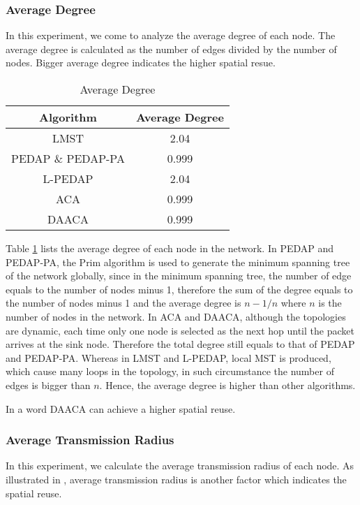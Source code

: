 \documentclass{elsarticle}
\begin{document}
\subsubsection{Average Degree}
In this experiment, we come to analyze the average degree of each node. The average degree is calculated as the number of edges divided by the number of nodes. Bigger average degree indicates the higher spatial resue\cite{label-7}.
\begin{table}[!hbp]
\centering
\caption{Average Degree} \label{AverageDegreeTable}
\begin{tabular}{cc}
\toprule
\textbf{Algorithm} & \textbf{Average Degree} \\
\midrule
LMST & 2.04 \\
PEDAP \& PEDAP-PA & 0.999 \\
L-PEDAP & 2.04 \\
ACA & 0.999 \\
DAACA & 0.999 \\
\bottomrule
\end{tabular}

\end{table}

Table \ref{AverageDegreeTable} lists the average degree of each node in the network. In PEDAP and PEDAP-PA, the Prim algorithm is used to generate the minimum spanning tree of the network globally, since in the minimum spanning tree, the number of edge equals to the number of nodes minus 1, therefore the sum of the degree equals to the number of nodes minus 1 and the average degree is $n-1/n$ where $n$ is the number of nodes in the network. In ACA and DAACA, although the topologies are dynamic, each time only one node is selected as the next hop until the packet arrives at the sink node. Therefore the total degree still equals to that of PEDAP and PEDAP-PA. Whereas in LMST and L-PEDAP, local MST is produced, which cause many loops in the topology, in such circumstance the number of edges is bigger than $n$. Hence, the average degree is higher than other algorithms.

In a word DAACA can achieve a higher spatial reuse.

\subsubsection{Average Transmission Radius} \label{AverageTransmissionRadius}
In this experiment, we calculate the average transmission radius of each node. As illustrated in \cite{label-7}, average transmission radius is another factor which indicates the spatial reuse.
\end{document}
